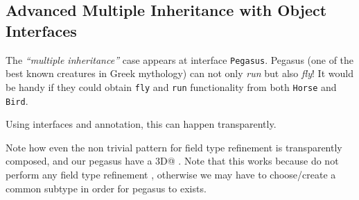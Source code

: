 \subsection{Advanced Multiple Inheritance with Object Interfaces}
The \emph{``multiple inheritance''} case appears at interface
\texttt{Pegasus}.
Pegasus (one of the best known creatures
in Greek mythology) can not only \emph{run} but also \emph{fly}! 
It would be handy if they could obtain \texttt{fly} and \texttt{run} functionality from both \texttt{Horse} and \texttt{Bird}.

 Using interfaces and \mixin annotation,
this can happen transparently.


Note how  even the non trivial pattern for field type refinement is transparently composed, and our pegasus have a \Q@Point3D@ \Q@location@.
Note that this works because \Q@Horse@ do not perform any field type refinement , otherwise we may have to choose/create a common subtype in order for pegasus to exists.

